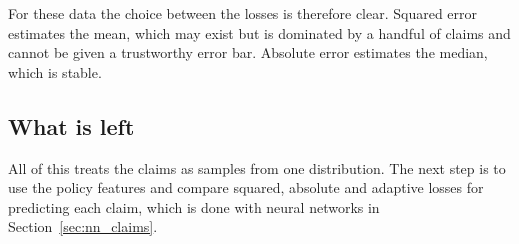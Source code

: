 \documentclass[11pt]{article}
\numberwithin{figure}{section}
\numberwithin{equation}{section}
\begin{document}
For these data the choice between the losses is therefore clear. Squared error estimates the mean,
which may exist but is dominated by a handful of claims and cannot be given a trustworthy error bar.
Absolute error estimates the median, which is stable.

\subsection{What is left}

All of this treats the claims as samples from one distribution. The next step is to use the policy
features and compare squared, absolute and adaptive losses for predicting each claim, which is done
with neural networks in Section~\ref{sec:nn_claims}.

\clearpage

\end{document}
